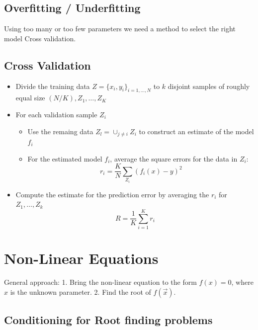 \documentclass[8pt,a4paper]{scrartcl}
\renewcommand{\compaq}{\setlength{\itemsep}{0mm}\setlength{\parskip}{0cm}}
\begin{document}
\begin{multicols*}{3}
\subsection{Overfitting / Underfitting}


Using too many or too few parameters \dahe we need a method to select the right model \dahe Cross validation.

\subsection{Cross Validation}

\begin{itemize}\compaq
\item Divide the training data $Z = \{ x_i, y_i\}_{i=1,\dots,N}$ to $k$ disjoint samples of roughly equal size $(N/K), Z_1,\dots, Z_K$
\item For each validation sample $Z_i$
\begin{itemize}\compaq
\item Use the remaing data $Z_l = \cup_{j \neq i} Z_i$ to construct an estimate of the model $f_i$
\item For the estimated model $f_i$, average the square errors for the data in $Z_i$:
\begin{equation*}
r_i = \frac{K}{N} \sum_{Z_i} (f_i(x) -y)^2
\end{equation*}
\end{itemize}
\item Compute the estimate for the prediction error by averaging the $r_i$ for $Z_1,\dots,Z_k$
\begin{equation*}
R = \frac{1}{K} \sum_{i=1}^K r_i
\end{equation*}
\end{itemize}



\section{Non-Linear Equations}


General approach: 1. Bring the non-linear equation to the form $f(x) = 0$, where $x$ is the unknown parameter. 2. Find the root of $f(\vec x)$.

\subsection{Conditioning for Root finding problems}


\end{multicols*}
\end{document}
